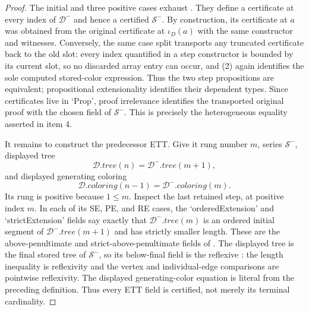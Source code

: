 \begin{proof}
The initial and three positive cases exhaust
.  They define a certificate at every
index of $\mathcal D^-$ and hence a certified
 $\mathcal S^-$.  By construction, its
certificate at $a$ was obtained from the original certificate at
$\iota_D(a)$ with the same constructor and witnesses.  Conversely, the
same case split transports any truncated certificate back to the old
slot: every index quantified in a step constructor is bounded by its
current slot, so no discarded array entry can occur, and (2) again
identifies the sole computed stored-color expression.  Thus the two
step propositions are equivalent; propositional extensionality
identifies their dependent types.  Since certificates live in `Prop',
proof irrelevance identifies the transported original proof with the
chosen field of $\mathcal S^-$.  This is precisely the heterogeneous
equality asserted in item 4.

It remains to construct the predecessor ETT.  Give it rung number $m$,
series $\mathcal S^-$, displayed tree
\[
 \mathcal D.\mathit{tree}(n)
   =\mathcal D^-.\mathit{tree}(m+1),
\]
and displayed generating coloring
\[
 \mathcal D.\mathit{coloring}(n-1)
   =\mathcal D^-.\mathit{coloring}(m).
\]
Its rung is positive because $1\leq m$.  Inspect the last retained step,
at positive index $m$.  In each of its SE, PE, and RE cases, the
`orderedExtension' and `strictExtension' fields say exactly that
$\mathcal D^-.\mathit{tree}(m)$ is an ordered initial segment of
$\mathcal D^-.\mathit{tree}(m+1)$ and has strictly smaller length.
These are the above-penultimate and strict-above-penultimate fields of
.  The displayed tree is the final stored
tree of $\mathcal S^-$, so its below-final field is the reflexive
: the length inequality is
reflexivity and the vertex and individual-edge comparisons are
pointwise reflexivity.  The displayed generating-color equation is
literal from the preceding definition.  Thus every ETT field is
certified, not merely its terminal cardinality.


\end{proof}
